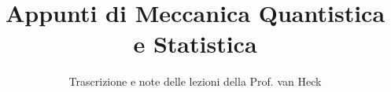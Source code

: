 \documentclass[a4paper,12pt]{article}
\title{Appunti di Meccanica Quantistica e Statistica}
\author{Trascrizione e note delle lezioni della Prof. van Heck}
\date{}
\begin{document}
\maketitle
\projectintro
\tableofcontents
\newpage

\end{document}
